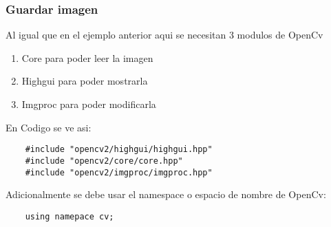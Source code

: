\begin{frame}[fragile]
   \frametitle{Guardar imagen}

        Al igual que en el ejemplo anterior aqui se necesitan 3 modulos de OpenCv

        \begin{enumerate}
            \item Core para poder leer la imagen
            \item Highgui para poder mostrarla
            \item Imgproc para poder modificarla
        \end{enumerate}

        \vspace{1cm}

        En Codigo se ve asi:

        \begin{lstlisting}
    #include "opencv2/highgui/highgui.hpp"
    #include "opencv2/core/core.hpp"
    #include "opencv2/imgproc/imgproc.hpp"
        \end{lstlisting}

        Adicionalmente se debe usar el namespace o espacio de nombre de OpenCv:

        \begin{lstlisting}
    using namepace cv;
        \end{lstlisting}
\end{frame}
